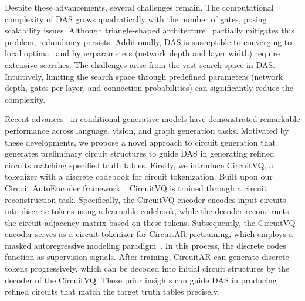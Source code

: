 Despite these advancements, several challenges remain. 
The computational complexity of DAS grows quadratically with the number of gates, posing scalability issues.
Although triangle-shaped architecture~\cite{wang2024tnet} partially mitigates this problem, redundancy persists. 
Additionally, DAS is susceptible to converging to local optima~\cite{liu2018darts} and hyperparameters (network depth and layer width) require extensive searches. 
The challenges arise from the vast search space in DAS. 
Intuitively, limiting the search space through predefined parameters (network depth, gates per layer, and connection probabilities) can significantly reduce the complexity.

Recent advances~\cite{openai2023gpt4, abramson2024alphafold3, esser2024sd3, li2024mar} in conditional generative models have demonstrated remarkable performance across language, vision, and graph generation tasks. 
Motivated by these developments, we propose a novel approach to circuit generation that generates preliminary circuit structures to guide DAS in generating refined circuits matching specified truth tables. 
Firstly, we introduce CircuitVQ, a tokenizer with a discrete codebook for circuit tokenization. 
Built upon our Circuit AutoEncoder framework~\cite{hou2022graphmae,li2023maskgae,wu2025mgvga}, CircuitVQ is trained through a circuit reconstruction task. 
Specifically, the CircuitVQ encoder encodes input circuits into discrete tokens using a learnable codebook, while the decoder reconstructs the circuit adjacency matrix based on these tokens.
Subsequently, the CircuitVQ encoder serves as a circuit tokenizer for CircuitAR pretraining, which employs a masked autoregressive modeling paradigm~\cite{chang2022maskgit, li2023mage}. 
In this process, the discrete codes function as supervision signals. 
After training, CircuitAR can generate discrete tokens progressively, which can be decoded into initial circuit structures by the decoder of the CircuitVQ. 
These prior insights can guide DAS in producing refined circuits that match the target truth tables precisely.

